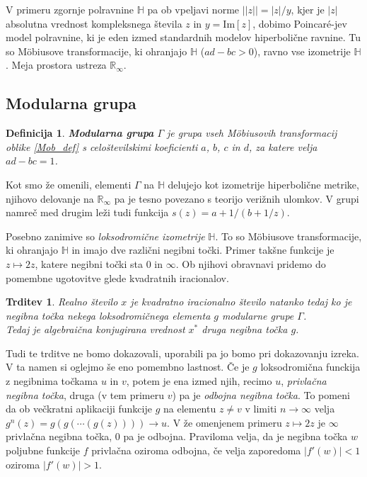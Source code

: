 \documentclass[a4paper,12pt]{article}
\def\R{\mathbb{R}} %
\def\H{\mathbb{H}} %
\newtheorem{trditev}{Trditev}
\newtheorem{definicija}{Definicija}
\begin{document}
V primeru zgornje polravnine $\H$ pa ob vpeljavi norme $||z|| = |z| / y$, kjer je $|z|$ absolutna vrednost kompleksnega števila $z$ in $y = \text{Im}[z]$, dobimo Poincar\'{e}-jev model polravnine, ki je eden izmed standardnih modelov hiperbolične ravnine. Tu so M\"obiusove transformacije, ki ohranjajo $\H$ ($ad - bc > 0$), ravno vse izometrije $\H$. Meja prostora ustreza $\R_{\infty}.$ 


\subsection{Modularna grupa}

\begin{definicija}
    \textbf{Modularna grupa} $\Gamma$ je grupa vseh M\"obiusovih transformacij oblike \eqref{Mob_def} s celoštevilskimi koeficienti $a$, $b$, $c$ in $d$, za katere velja $ad - bc = 1$.
\end{definicija}

Kot smo že omenili, elementi $\Gamma$ na $\H$ delujejo kot izometrije hiperbolične metrike, njihovo delovanje na $\R_{\infty}$ pa je tesno povezano s teorijo verižnih ulomkov. V grupi namreč med drugim leži tudi funkcija $s(z) = a + 1/(b + 1/z)$.

Posebno zanimive so \emph{loksodromične izometrije} $\H$. To so M\"obiusove transformacije, ki ohranjajo $\H$ in imajo dve različni negibni točki. Primer takšne funkcije je $z \mapsto 2z$, katere negibni točki sta $0$ in $\infty$. Ob njihovi obravnavi pridemo do pomembne ugotovitve glede kvadratnih iracionalov.
\begin{trditev}
    \label{Lokso}
    Realno število $x$ je kvadratno iracionalno število natanko tedaj ko je negibna točka nekega loksodromičnega elementa $g$ modularne grupe $\Gamma$.\\
    Tedaj je algebraična konjugirana vrednost $x^*$ druga negibna točka $g$.
\end{trditev}

Tudi te trditve ne bomo dokazovali,  uporabili pa jo bomo pri dokazovanju izreka. V ta namen si oglejmo še eno pomembno lastnost. Če je $g$ loksodromična funckija z negibnima točkama $u$ in $v$, potem je ena izmed njih, recimo $u$, \emph{privlačna negibna točka}, druga (v tem primeru $v$) pa je \emph{odbojna negibna točka}. To pomeni da ob večkratni aplikaciji funkcije $g$ na elementu $z \neq v$ v limiti $n \to \infty$ velja $g^n(z) = g(g(\cdots(g(z)))) \to u$. V že omenjenem primeru $z \mapsto 2z$ je $\infty$ privlačna negibna točka, $0$ pa je odbojna. Praviloma velja, da je negibna točka $w$ poljubne funkcije $f$ privlačna oziroma odbojna, če velja zaporedoma $|f'(w)| < 1$ oziroma $|f'(w)| > 1$.
\newpage
\end{document}
